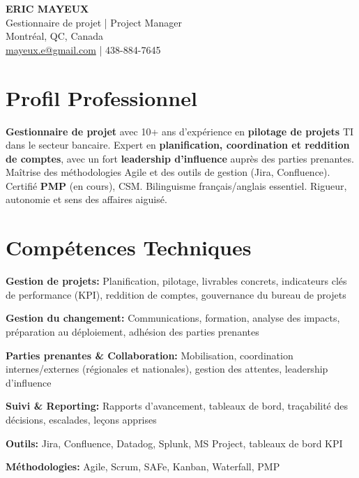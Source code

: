 \documentclass[11pt,a4paper]{article}
\begin{document}
\begin{center}
    {\LARGE \textbf{ERIC MAYEUX}}\\
    \vspace{4pt}
    {\large Gestionnaire de projet | Project Manager}\\
    \vspace{4pt}
    Montréal, QC, Canada\\
    \href{mailto:mayeux.e@gmail.com}{mayeux.e@gmail.com} | 438-884-7645
\end{center}

\vspace{8pt}

\section*{Profil Professionnel}
\noindent
\textbf{Gestionnaire de projet} avec 10+ ans d'expérience en \textbf{pilotage de projets} TI dans le secteur bancaire. Expert en \textbf{planification, coordination et reddition de comptes}, avec un fort \textbf{leadership d'influence} auprès des parties prenantes. Maîtrise des méthodologies Agile et des outils de gestion (Jira, Confluence). Certifié \textbf{PMP} (en cours), CSM. Bilinguisme français/anglais essentiel. Rigueur, autonomie et sens des affaires aiguisé.

\section*{Compétences Techniques}

\textbf{Gestion de projets:} Planification, pilotage, livrables concrets, indicateurs clés de performance (KPI), reddition de comptes, gouvernance du bureau de projets

\textbf{Gestion du changement:} Communications, formation, analyse des impacts, préparation au déploiement, adhésion des parties prenantes

\textbf{Parties prenantes \& Collaboration:} Mobilisation, coordination internes/externes (régionales et nationales), gestion des attentes, leadership d'influence

\textbf{Suivi \& Reporting:} Rapports d'avancement, tableaux de bord, traçabilité des décisions, escalades, leçons apprises

\textbf{Outils:} Jira, Confluence, Datadog, Splunk, MS Project, tableaux de bord KPI

\textbf{Méthodologies:} Agile, Scrum, SAFe, Kanban, Waterfall, PMP
\end{document}
